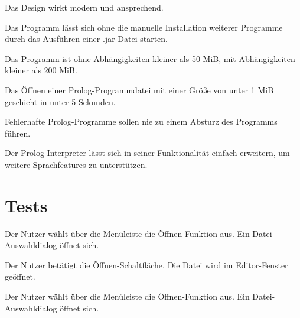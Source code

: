 \documentclass[parskip=full,11pt,twoside]{scrartcl}
\begin{document}
Das Design wirkt modern und ansprechend.


Das Programm lässt sich ohne die manuelle Installation weiterer Programme durch das Ausführen einer .jar Datei starten.


Das Programm ist ohne Abhängigkeiten kleiner als 50 MiB, mit Abhängigkeiten kleiner als 200 MiB.


Das Öffnen einer Prolog-Programmdatei mit einer Größe von unter 1 MiB geschieht in unter 5 Sekunden.


Fehlerhafte Prolog-Programme sollen nie zu einem Absturz des Programms führen.


Der Prolog-Interpreter lässt sich in seiner Funktionalität einfach erweitern, um weitere Sprachfeatures zu unterstützen.

\section{Tests}


{Der Nutzer wählt über die Menüleiste die Öffnen-Funktion aus.}
{Ein Datei-Auswahldialog öffnet sich.}

{Der Nutzer betätigt die Öffnen-Schaltfläche.}
{Die Datei wird im Editor-Fenster geöffnet.}



{Der Nutzer wählt über die Menüleiste die Öffnen-Funktion aus.}
{Ein Datei-Auswahldialog öffnet sich.}
\end{document}
